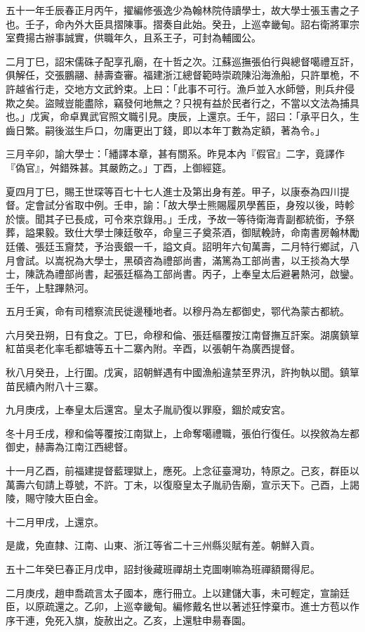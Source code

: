 \begin{pinyinscope}
五十一年壬辰春正月丙午，擢編修張逸少為翰林院侍讀學士，故大學士張玉書之子也。壬子，命內外大臣具摺陳事。摺奏自此始。癸丑，上巡幸畿甸。詔右衛將軍宗室費揚古辦事誠實，供職年久，且系王子，可封為輔國公。

二月丁巳，詔宋儒硃子配享孔廟，在十哲之次。江蘇巡撫張伯行與總督噶禮互訐，俱解任，交張鵬翮、赫壽查審。福建浙江總督範時崇疏陳沿海漁船，只許單桅，不許越省行走，交地方文武鈐束。上曰：「此事不可行。漁戶並入水師營，則兵弁侵欺之矣。盜賊豈能盡除，竊發何地無之？只視有益於民者行之，不當以文法為捕具也。」戊寅，命卓異武官照文職引見。庚辰，上還京。壬午，詔曰：「承平日久，生齒日繁。嗣後滋生戶口，勿庸更出丁錢，即以本年丁數為定額，著為令。」

三月辛卯，諭大學士：「繙譯本章，甚有關系。昨見本內『假官』二字，竟譯作『偽官』，舛錯殊甚。其嚴飭之。」丁酉，上御經筵。

夏四月丁巳，賜王世琛等百七十七人進士及第出身有差。甲子，以康泰為四川提督。定會試分省取中例。壬申，諭：「故大學士熊賜履夙學舊臣，身歿以後，時軫於懷。聞其子已長成，可令來京錄用。」壬戌，予故一等待衛海青副都統銜，予祭葬，謚果毅。致仕大學士陳廷敬卒，命皇三子奠茶酒，御賦輓詩，命南書房翰林勵廷儀、張廷玉齎焚，予治喪銀一千，謚文貞。詔明年六旬萬壽，二月特行鄉試，八月會試。以嵩祝為大學士，黑碩咨為禮部尚書，滿篤為工部尚書，以王掞為大學士，陳詵為禮部尚書，起張廷樞為工部尚書。丙子，上奉皇太后避暑熱河，啟鑾。壬午，上駐蹕熱河。

五月壬寅，命有司稽察流民徙邊種地者。以穆丹為左都御史，鄂代為蒙古都統。

六月癸丑朔，日有食之。丁巳，命穆和倫、張廷樞覆按江南督撫互訐案。湖廣鎮筸紅苗吳老化率毛都塘等五十二寨內附。辛酉，以張朝午為廣西提督。

秋八月癸丑，上行圍。戊寅，詔朝鮮遇有中國漁船違禁至界汛，許拘執以聞。鎮筸苗民續內附八十三寨。

九月庚戌，上奉皇太后還宮。皇太子胤礽復以罪廢，錮於咸安宮。

冬十月壬戌，穆和倫等覆按江南獄上，上命奪噶禮職，張伯行復任。以揆敘為左都御史，赫壽為江南江西總督。

十一月乙酉，前福建提督藍理獄上，應死。上念征臺灣功，特原之。己亥，群臣以萬壽六旬請上尊號，不許。丁未，以復廢皇太子胤礽告廟，宣示天下。己酉，上謁陵，賜守陵大臣白金。

十二月甲戌，上還京。

是歲，免直隸、江南、山東、浙江等省二十三州縣災賦有差。朝鮮入貢。

五十二年癸巳春正月戊申，詔封後藏班禪胡土克圖喇嘛為班禪額爾得尼。

二月庚戌，趙申喬疏言太子國本，應行冊立。上以建儲大事，未可輕定，宣諭廷臣，以原疏還之。乙卯，上巡幸畿甸。編修戴名世以著述狂悖棄市。進士方苞以作序干連，免死入旗，旋赦出之。乙亥，上還駐申昜春園。


\end{pinyinscope}
